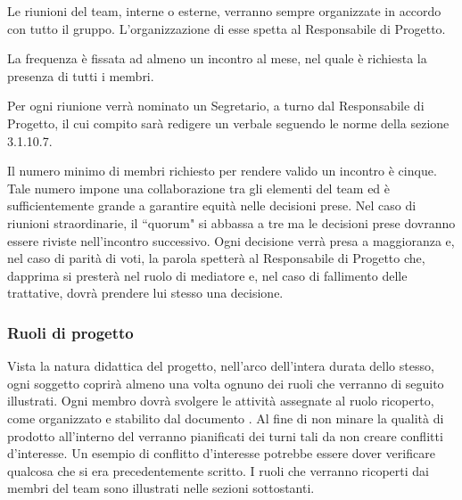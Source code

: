             Le riunioni del team, interne o esterne, verranno sempre organizzate in accordo con tutto il gruppo.
            L'organizzazione di esse spetta al Responsabile di Progetto.


                La frequenza è fissata ad almeno un incontro al mese, nel quale è richiesta la presenza di tutti i membri.


                Per ogni riunione verrà nominato un Segretario, a turno dal Responsabile di Progetto, il cui compito sarà
                redigere un verbale seguendo le norme della sezione 3.1.10.7.

\newpage


                Il numero minimo di membri richiesto per rendere valido un incontro è cinque. Tale numero impone una
                collaborazione tra gli elementi del team ed è sufficientemente grande a garantire equità nelle decisioni prese.
                Nel caso di riunioni straordinarie, il ``quorum" si abbassa a tre ma le decisioni prese dovranno essere
                riviste nell'incontro successivo.
                Ogni decisione verrà presa a maggioranza e, nel caso di parità di voti, la parola spetterà al
                Responsabile di Progetto che, dapprima si presterà nel ruolo di mediatore e, nel caso di fallimento
                delle trattative, dovrà prendere lui stesso una decisione.

        \subsubsection{Ruoli di progetto}

            Vista la natura didattica del progetto, nell'arco dell'intera durata dello stesso, ogni soggetto coprirà almeno
            una volta ognuno dei ruoli che verranno di seguito illustrati.
            Ogni membro dovrà svolgere le attività assegnate al ruolo ricoperto, come organizzato e stabilito dal documento
            \vPianoDiProgetto{}.
            Al fine di non minare la qualità di prodotto all'interno del \vPianoDiProgetto{} verranno pianificati dei turni
            tali da non creare conflitti d'interesse. Un esempio di conflitto d'interesse potrebbe essere dover verificare
            qualcosa che si era precedentemente scritto.
            I ruoli che verranno ricoperti dai membri del team sono illustrati nelle sezioni sottostanti.

